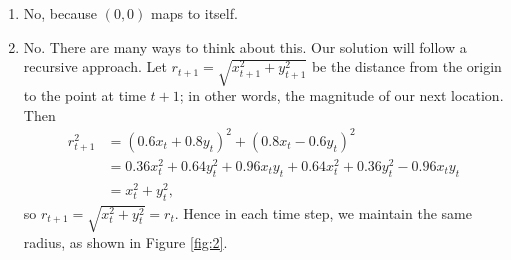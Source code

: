 \documentclass{article}
\begin{document}
    \vspace{1.5mm}
    \begin{enumerate}
        \item No, because $(0, 0)$ maps to itself.
        \item No. There are many ways to think about this. Our solution will follow a recursive approach. Let $r_{t + 1} = \sqrt{x_{t + 1}^{2} + y_{t + 1}^{2}}$ be the distance from the origin to the point at time $t + 1$; in other words, the magnitude of our next location. Then
        \begin{align*}
            r_{t + 1}^{2} &= (0.6x_{t} + 0.8y_{t})^{2} + (0.8x_{t} - 0.6y_{t})^{2} \\
            &= 0.36x_{t}^{2} + 0.64y_{t}^{2} + 0.96x_{t}y_{t} + 0.64x_{t}^{2} + 0.36y_{t}^{2} - 0.96x_{t}y_{t} \\
            &= x_{t}^{2} + y_{t}^{2},
        \end{align*}
        so $r_{t + 1} = \sqrt{x_{t}^{2} + y_{t}^{2}} = r_{t}$. Hence in each time step, we maintain the same radius, as shown in Figure \ref*{fig:2}.
        

\end{enumerate}
\end{document}
